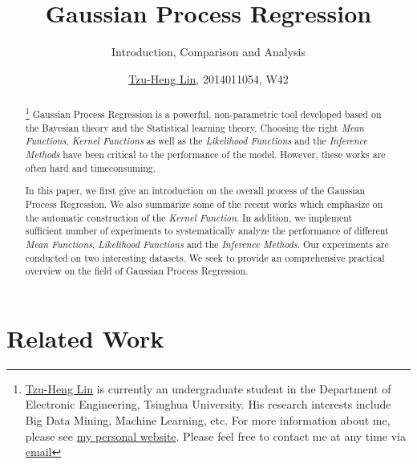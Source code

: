 \documentclass{sig-alternate-05-2015}
\begin{document}
\title{Gaussian Process Regression}
\subtitle{Introduction, Comparison and Analysis}
\author{
    \alignauthor \color{blue}\href{http://lzhbrian.me}{Tzu-Heng Lin}\color{black}, 2014011054, W42\\
}


\maketitle
\begin{abstract}
\footnote{\color{blue}\href{http://lzhbrian.me}{Tzu-Heng Lin} \color{black} is currently an undergraduate student in the Department of Electronic Engineering, Tsinghua University. His research interests include Big Data Mining, Machine Learning, etc. For more information about me, please see \color{blue}\href{http://lzhbrian.me}{my personal website}\color{black}.
Please feel free to contact me at any time via \color{blue}\href{mailto:lzhbrian@gmail.com}{email} }
Gaussian Process Regression is a powerful, non-parametric tool developed based on the Bayesian theory and the Statistical learning theory. Choosing the right \emph{Mean Functions}, \emph{Kernel Functions} as well as the \emph{Likelihood Functions} and the \emph{Inference Methods} have been critical to the performance of the model. However, these works are often hard and timeconsuming.

In this paper, we first give an introduction on the overall process of the Gaussian Process Regression. 
We also summarize some of the recent works which emphasize on the automatic construction of the \emph{Kernel Function}.
In addition, we implement sufficient number of experiments to systematically analyze the performance of different \emph{Mean Functions}, \emph{Likelihood Functions} and the \emph{Inference Methods}. Our experiments are conducted on two interesting datasets. We seek to provide an comprehensive practical overview on the field of Gaussian Process Regression.

\end{abstract}




%
%
\printccsdesc




\section{Related Work} \label{sec:related}
\end{document}
